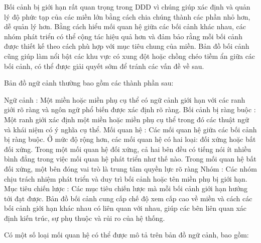 Bối cảnh bị giới hạn rất quan trọng trong DDD vì chúng giúp xác định và quản lý độ phức tạp của các miền lớn bằng cách chia chúng thành các phần nhỏ hơn, dễ quản lý hơn. Bằng cách hiểu mối quan hệ giữa các bối cảnh khác nhau, các nhóm phát triển có thể cộng tác hiệu quả hơn và đảm bảo rằng mỗi bối cảnh được thiết kế theo cách phù hợp với mục tiêu chung của miền. Bản đồ bối cảnh cũng giúp làm nổi bật các khu vực có xung đột hoặc chồng chéo tiềm ẩn giữa các bối cảnh, có thể được giải quyết sớm để tránh các vấn đề về sau.

Bản đồ ngữ cảnh thường bao gồm các thành phần sau:

Ngữ cảnh : Một miền hoặc miền phụ cụ thể có ngữ cảnh giới hạn với các ranh giới rõ ràng và ngôn ngữ phổ biến được xác định rõ ràng.
Bối cảnh bị ràng buộc : Một ranh giới xác định một miền hoặc miền phụ cụ thể trong đó các thuật ngữ và khái niệm có ý nghĩa cụ thể.
Mối quan hệ : Các mối quan hệ giữa các bối cảnh bị ràng buộc. Ở mức độ rộng hơn, các mối quan hệ có hai loại: đối xứng hoặc bất đối xứng. Trong một mối quan hệ đối xứng, cả hai bên đều có tiếng nói ít nhiều bình đẳng trong việc mối quan hệ phát triển như thế nào. Trong mối quan hệ bất đối xứng, một bên đóng vai trò là trung tâm quyền lực rõ ràng
Nhóm : Các nhóm chịu trách nhiệm phát triển và duy trì bối cảnh hoặc tên miền phụ bị giới hạn.
Mục tiêu chiến lược : Các mục tiêu chiến lược mà mỗi bối cảnh giới hạn hướng tới đạt được.
Bản đồ bối cảnh cung cấp chế độ xem cấp cao về miền và cách các bối cảnh giới hạn khác nhau có liên quan với nhau, giúp các bên liên quan xác định kiến ​​trúc, sự phụ thuộc và rủi ro của hệ thống.

Có một số loại mối quan hệ có thể được mô tả trên bản đồ ngữ cảnh, bao gồm:

